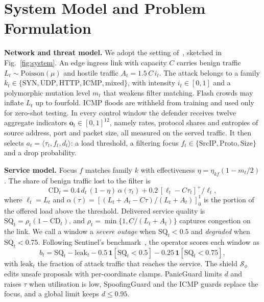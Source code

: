 \documentclass[conference]{IEEEtran}
\begin{document}
\section{System Model and Problem Formulation}
\label{sec:model}


\textbf{Network and threat model.} We adopt the setting of~\cite{alfatemi2026sentinel}, sketched in Fig.~\ref{fig:system}. An edge ingress link with capacity $C$ carries benign traffic $L_t\sim\mathrm{Poisson}(\mu)$ and hostile traffic $A_t=1.5\,C\,i_t$. The attack belongs to a family $k_t\in\{\mathrm{SYN},\mathrm{UDP},\mathrm{HTTP},\mathrm{ICMP},\mathrm{mixed}\}$, with intensity $i_t\in[0,1]$ and a polymorphic mutation level $m_t$ that weakens filter matching. Flash crowds may inflate $L_t$ up to fourfold. ICMP floods are withheld from training and used only for zero-shot testing. In every control window the defender receives twelve aggregate indicators $\mathbf{o}_t\in[0,1]^{12}$, namely rates, protocol shares and entropies of source address, port and packet size, all measured on the served traffic. It then selects $a_t=\langle\tau_t,f_t,d_t\rangle$: a load threshold, a filtering focus $f_t\in\{\mathrm{SrcIP},\mathrm{Proto},\mathrm{Size}\}$ and a drop probability.

\textbf{Service model.} Focus $f$ matches family $k$ with effectiveness $\eta=\eta_{kf}(1-m_t/2)$. The share of benign traffic lost to the filter is
\begin{equation}
\mathrm{CD}_t = 0.4\,d_t\,(1-\eta)\,\alpha(\tau_t) + 0.2\,[\ell_t-C\tau_t]^+/\ell_t ,
\label{eq:cd}
\end{equation}
where $\ell_t=L_t$ and $\alpha(\tau)=[(L_t+A_t-C\tau)/(L_t+A_t)]_0^1$ is the portion of the offered load above the threshold. Delivered service quality is $\mathrm{SQ}_t=\rho_t(1-\mathrm{CD}_t)$, and $\rho_t=\min\{1,C/(L_t+A_t)\}$ captures congestion on the link. We call a window a \emph{severe outage} when $\mathrm{SQ}_t<0.5$ and \emph{degraded} when $\mathrm{SQ}_t<0.75$. Following Sentinel's benchmark~\cite{alfatemi2026sentinel}, the operator scores each window as
\begin{equation}
b_t=\mathrm{SQ}_t-\mathrm{leak}_t-0.5\,\mathbf{1}[\mathrm{SQ}_t<0.5]-0.25\,\mathbf{1}[\mathrm{SQ}_t<0.75],
\label{eq:score}
\end{equation}
with $\mathrm{leak}_t$ the fraction of attack traffic that reaches the service. The shield $\mathcal{S}_\phi$ edits unsafe proposals with per-coordinate clamps. PanicGuard limits $d$ and raises $\tau$ when utilisation is low, SpoofingGuard and the ICMP guards replace the focus, and a global limit keeps $d\le0.95$.
\end{document}
